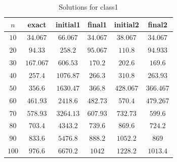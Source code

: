 \documentclass[a4paper, 11pt]{article}
\begin{document}
	\begin{table}[H]
		\centering
		\begin{tabular}{c|c|c|c|c|c}
			\textbf{$ n $} 	& \textbf{exact} & \textbf{initial1}   & \textbf{final1}& \textbf{initial2} & \textbf{final2} 	\\ \hline
			$ 10  $			& $ 34.067 $ 	& $ 66.067 $ 			& $ 34.067 $  	& $ 38.067 $ 		& $ 34.067 $		\\ \hline
			$ 20  $			& $ 94.33 $ 	& $ 258.2 $ 			& $ 95.067 $  	& $ 110.8 $ 		& $ 94.933 $		\\ \hline
			$ 30  $			& $ 167.067 $ 	& $ 606.53 $ 			& $ 170.2 $  	& $ 202.6 $ 		& $ 169.6 $ \\ \hline
			$ 40  $			& $ 257.4 $ 	& $ 1076.87 $ 			& $ 266.3 $  	& $ 310.8 $ 		& $ 263.93 $ \\ \hline
			$ 50  $			& $ 356.6 $ 	& $ 1630.47 $ 			& $ 366.8 $  	& $ 428.067 $ 		& $ 366.467 $ \\ \hline
			$ 60  $			& $ 461.93 $ 	& $ 2418.6 $ 			& $ 482.73 $  	& $ 570.4 $ 		& $ 479.267 $ \\ \hline
			$ 70 $			& $ 578.93 $ 	& $ 3264.13 $ 			& $ 607.93 $  	& $ 732.73 $ 		& $ 599.6 $ \\ \hline
			$ 80 $			& $ 703.4 $ 	& $ 4343.2 $ 			& $ 739.6 $  	& $ 869.6 $ 		& $ 724.2 $ \\ \hline
			$ 90 $			& $ 833.6 $ 	& $ 5476.8 $ 			& $ 888.2 $  	& $ 1052.2 $ 		& $ 869 $ \\ \hline
			$ 100 $			& $ 976.6 $ 	& $ 6670.2 $ 			& $ 1042 $  	& $ 1228.2 $ 		& $ 1013.4 $ \\
		\end{tabular}
		\caption{Solutions for class1}
		\label{table:sols}
	\end{table}
	
\end{document}
